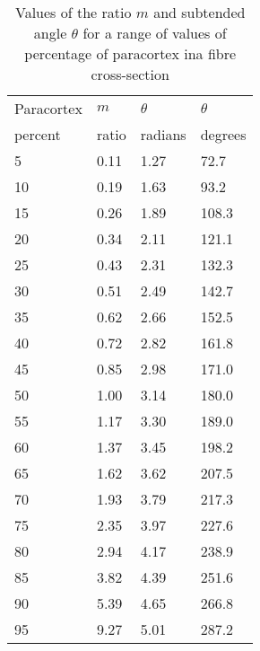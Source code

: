 %

\begin{table}[htp]
\centering
\caption{Values of the ratio $m$ and subtended angle $\theta$ for a range of values of percentage of paracortex ina  fibre cross-section}
\label{tab:ptom}
\vspace{0.1in}
\begin{tabular}{|p{0.7in}|p{0.7in}|p{0.7in}|p{0.7in}|}  \hline
    Paracortex & $m$  & $\theta$ & $\theta$  \\ 
  percent & ratio & radians & degrees \\ \hline
   5 & 0.11 & 1.27 & 72.7  \\
  10 & 0.19 & 1.63 & 93.2 \\
  15 & 0.26 & 1.89 & 108.3 \\
  20 & 0.34 & 2.11 & 121.1 \\
  25 & 0.43 & 2.31 & 132.3 \\
  30 & 0.51 & 2.49 & 142.7 \\
  35 & 0.62 & 2.66 & 152.5 \\
  40 & 0.72 & 2.82 & 161.8 \\
  45 & 0.85 & 2.98 & 171.0 \\
  50 & 1.00 & 3.14 & 180.0 \\
  55 & 1.17 & 3.30 & 189.0 \\
  60 & 1.37 & 3.45 & 198.2 \\
  65 & 1.62 & 3.62 & 207.5 \\
  70 & 1.93 & 3.79 & 217.3 \\
  75 & 2.35 & 3.97 & 227.6 \\
  80 & 2.94 & 4.17 & 238.9 \\
  85 & 3.82 & 4.39 & 251.6 \\
  90 & 5.39 & 4.65 & 266.8 \\
  95 & 9.27 & 5.01 & 287.2  \\ \hline
\end{tabular}
\end{table}

%
